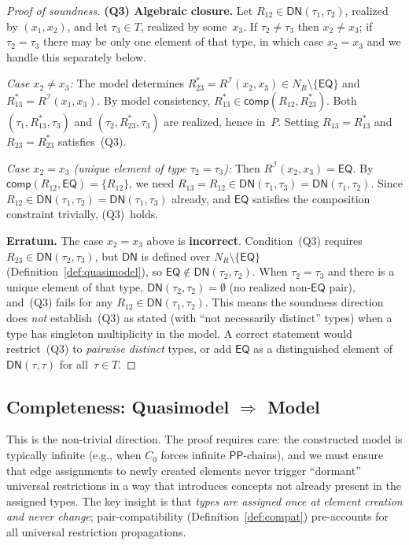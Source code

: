 \documentclass[a4paper,11pt]{article}
\theoremstyle{definition}
\newcommand{\NR}{\ensuremath{N_R}}
\newcommand{\interp}{\ensuremath{\mathcal{I}}}
\newcommand{\EQ}{\ensuremath{\mathsf{EQ}}}
\newcommand{\PP}{\ensuremath{\mathsf{PP}}}
\newcommand{\comp}{\ensuremath{\mathsf{comp}}}
\begin{document}
\begin{proof}[Proof of soundness]
\smallskip\noindent
\textbf{(Q3) Algebraic closure.}\; Let $R_{12} \in \mathsf{DN}(\tau_1,
\tau_2)$, realized by $(x_1, x_2)$, and let $\tau_3 \in T$, realized
by some~$x_3$.  If $\tau_2 \neq \tau_3$ then $x_2 \neq x_3$; if
$\tau_2 = \tau_3$ there may be only one element of that type, in which
case $x_2 = x_3$ and we handle this separately below.

\emph{Case $x_2 \neq x_3$:} The model determines $R_{23}^* =
R^{\interp}(x_2, x_3) \in \NR \setminus \{\EQ\}$ and $R_{13}^* =
R^{\interp}(x_1, x_3)$.  By model consistency, $R_{13}^* \in
\comp(R_{12}, R_{23}^*)$.  Both $(\tau_1, R_{13}^*, \tau_3)$ and
$(\tau_2, R_{23}^*, \tau_3)$ are realized, hence in~$P$.  Setting
$R_{13} = R_{13}^*$ and $R_{23} = R_{23}^*$ satisfies~(Q3).

\emph{Case $x_2 = x_3$ (unique element of type $\tau_2 = \tau_3$):}
Then $R^{\interp}(x_2, x_3) = \EQ$.  By
$\comp(R_{12}, \EQ) = \{R_{12}\}$, we need $R_{13} = R_{12} \in
\mathsf{DN}(\tau_1, \tau_3) = \mathsf{DN}(\tau_1, \tau_2)$.  Since
$R_{12} \in \mathsf{DN}(\tau_1, \tau_2) = \mathsf{DN}(\tau_1, \tau_3)$
already, and $\EQ$ satisfies the composition constraint
trivially, (Q3)~holds.

\medskip
\noindent\textbf{Erratum.}\;
The case $x_2 = x_3$ above is \textbf{incorrect}.  Condition~(Q3)
requires $R_{23} \in \mathsf{DN}(\tau_2, \tau_3)$, but
$\mathsf{DN}$ is defined over $\NR \setminus \{\EQ\}$
(Definition~\ref{def:quasimodel}), so $\EQ \notin
\mathsf{DN}(\tau_2, \tau_2)$.  When $\tau_2 = \tau_3$ and there is a
unique element of that type, $\mathsf{DN}(\tau_2, \tau_2) = \emptyset$
(no realized non-$\EQ$ pair), and~(Q3) fails for any $R_{12} \in
\mathsf{DN}(\tau_1, \tau_2)$.  This means the soundness direction
does \emph{not} establish~(Q3) as stated (with ``not necessarily
distinct'' types) when a type has singleton multiplicity in the model.
A correct statement would restrict~(Q3) to \emph{pairwise distinct}
types, or add $\EQ$ as a distinguished element of
$\mathsf{DN}(\tau, \tau)$ for all~$\tau \in T$.
\end{proof}

\subsection{Completeness: Quasimodel $\Rightarrow$ Model}
\label{sec:completeness}

This is the non-trivial direction.  The proof requires care: the
constructed model is typically infinite (e.g., when $C_0$ forces
infinite $\PP$-chains), and we must ensure that edge assignments to
newly created elements never trigger ``dormant'' universal restrictions
in a way that introduces concepts not already present in the assigned
types.  The key insight is that \emph{types are assigned once at
element creation and never change}; pair-compatibility
(Definition~\ref{def:compat}) pre-accounts for all universal
restriction propagations.
\end{document}
